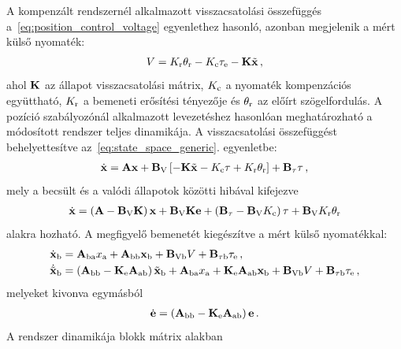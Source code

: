 A kompenzált rendszernél alkalmazott visszacsatolási összefüggés a~\eqref{eq:position_control_voltage} egyenlethez
hasonló, azonban megjelenik a mért külső nyomaték:
\begin{align}
    V = K_{\mathrm{r}} \theta_{\mathrm{r}} - K_{\mathrm{c}} \tau_{\mathrm{e}} - \mathbf{K} \tilde{\mathbf{x}}\,,
\end{align}
ahol $\mathbf{K}$ az állapot visszacsatolási mátrix, $K_{\mathrm{c}}$ a nyomaték kompenzációs együttható,
$K_{\mathrm{r}}$ a bemeneti erősítési tényezője és $\theta_{\mathrm{r}}$ az előírt szögelfordulás.
A pozíció szabályozónál alkalmazott levezetéshez hasonlóan meghatározható a módosított rendszer teljes dinamikája.
A visszacsatolási összefüggést behelyettesítve az~\eqref{eq:state_space_generic}. egyenletbe:
\begin{align}\label{eq:state_control_law_subs}
    \dot{\mathbf{x}} = \mathbf{A} \mathbf{x} + \mathbf{B}_{\mathrm{V}}\left[-\mathbf{K} \tilde{\mathbf{x}} -K_{\mathrm{c}} \tau + K_{\mathrm{r}} \theta_{\mathrm{r}}\right] + \mathbf{B}_{\mathrm{\tau}} \tau\,,
\end{align}
mely a becsült és a valódi állapotok közötti hibával kifejezve 
\begin{align}
    \dot{\mathbf{x}} = \left(\mathbf{A} - \mathbf{B}_{\mathrm{V}} \mathbf{K}\right) \mathbf{x} + 
    \mathbf{B}_{\mathrm{V}} \mathbf{K} \mathbf{e} + 
    \left(\mathbf{B}_{\mathrm{\tau}} - \mathbf{B}_{\mathrm{V}} K_{\mathrm{c}}\right) \tau + 
    \mathbf{B}_{\mathrm{V}} K_{\mathrm{r}} \theta_{\mathrm{r}}
\end{align}
alakra hozható. A megfigyelő bemenetét kiegészítve a mért külső nyomatékkal:
\begin{equation}
    \begin{split}
    \dot{\mathbf{x}}_{\mathrm{b}} &= \mathbf{A}_{\mathrm{ba}} x_{\mathrm{a}} + \mathbf{A}_{\mathrm{bb}} \mathbf{x}_{\mathrm{b}} + 
    \mathbf{B}_{\mathrm{Vb}} V + \mathbf{B}_{\mathrm{\tau b}} \tau_{\mathrm{e}}\,,\\
    \dot{\tilde{\mathbf{x}}}_{\mathrm{b}} &= \left(\mathbf{A}_{\mathrm{bb}} - \mathbf{K}_{\mathrm{e}} \mathbf{A}_{\mathrm{ab}}\right) \tilde{\mathbf{x}}_{\mathrm{b}} +
    \mathbf{A}_{\mathrm{ba}} x_{\mathrm{a}} +
    \mathbf{K}_{\mathrm{e}} \mathbf{A}_{\mathrm{ab}} \mathbf{x}_{\mathrm{b}} +
    \mathbf{B}_{\mathrm{Vb}} V + \mathbf{B}_{\mathrm{\tau b}} \tau_{\mathrm{e}}\,,
    \end{split}
\end{equation}
melyeket kivonva egymásból
\begin{align}
    \dot{\mathbf{e}} = \left(\mathbf{A}_{\mathrm{bb}} - \mathbf{K}_{\mathrm{e}} \mathbf{A}_{\mathrm{ab}}\right) \mathbf{e}\,.
\end{align}
A rendszer dinamikája blokk mátrix alakban
